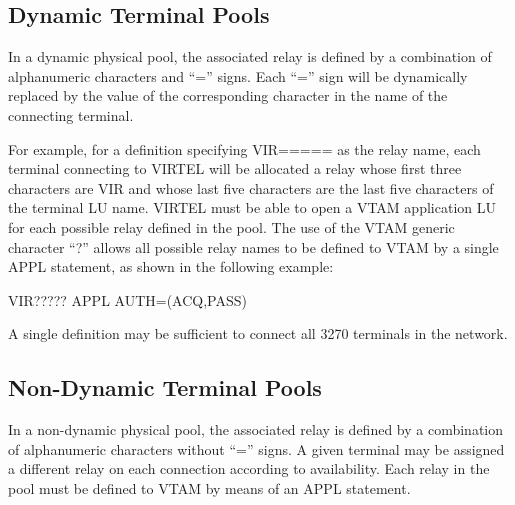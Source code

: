 \documentclass[letterpaper,10pt,english]{sphinxmanual}
\begin{document}
\ignorespaces 

\subsection{Dynamic Terminal Pools}
\label{\detokenize{connectivity_guide:dynamic-terminal-pools}}\label{\detokenize{connectivity_guide:index-140}}
In a dynamic physical pool, the associated relay is defined by a combination of alphanumeric characters and “=” signs. Each “=” sign will be dynamically replaced by the value of the corresponding character in the name of the connecting
terminal.

For example, for a definition specifying VIR===== as the relay name, each terminal connecting to VIRTEL will be allocated a relay whose first three characters are VIR and whose last five characters are the last five characters of the terminal LU name. VIRTEL must be able to open a VTAM application LU for each possible relay defined in the pool. The use of the VTAM generic character “?” allows all possible relay names to be defined to VTAM by a single APPL statement, as shown in the following example:

\begin{sphinxVerbatim}[commandchars=\\\{\}]
VIR????? APPL AUTH=(ACQ,PASS)
\end{sphinxVerbatim}

A single definition may be sufficient to connect all 3270 terminals in the network.

\ignorespaces 

\subsection{Non-Dynamic Terminal Pools}
\label{\detokenize{connectivity_guide:non-dynamic-terminal-pools}}\label{\detokenize{connectivity_guide:index-141}}
In a non-dynamic physical pool, the associated relay is defined by a combination of alphanumeric characters without “=” signs. A given terminal may be assigned a different relay on each connection according to availability. Each relay in the pool must be defined to VTAM by means of an APPL statement.
\end{document}
